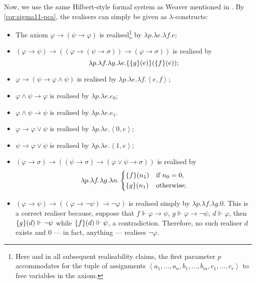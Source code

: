 \documentclass[11pt]{article}
\theoremstyle{plain}
\theoremstyle{definition}
\newcommand{\tuple}[1]{\left\langle #1 \right\rangle}
\begin{document}
Now, we use the same Hilbert-style formal system as Weaver mentioned in \cite{weaver09-cm}. By \autoref{cor:sigma11-pca}, the realisers can simply be given as $\lambda$-constructs:
\begin{itemize}
    \item The axiom $\varphi \rightarrow \left(\psi \rightarrow \varphi\right)$ is realised\footnote{Here and in all subsequent realisability claims, the first parameter $p$ accommodates for the tuple of assignments $\tuple{a_1, \ldots, a_n, b_1, \ldots, b_m, c_1, \ldots, c_r}$ to free variables in the axiom.} by $\lambda p. \lambda e. \lambda f. e$;
    \item $\left(\varphi \rightarrow \psi\right) \rightarrow \left(\left(\varphi \rightarrow \left(\psi \rightarrow \sigma\right)\right) \rightarrow \left(\varphi \rightarrow \sigma\right)\right)$ is realised by
          \[\lambda p. \lambda f. \lambda g. \lambda e. \mleft\{\mleft\{g\mright\}\mleft(e\mright)\mright\}\mleft(\mleft\{f\mright\}\mleft(e\mright)\mright);\]
    \item $\varphi \rightarrow \left(\psi \rightarrow \varphi \land \psi\right)$ is realised by $\lambda p. \lambda e. \lambda f. \tuple{e, f}$;
    \item $\varphi \land \psi \rightarrow \varphi$ is realised by $\lambda p. \lambda e. e_0$;
    \item $\varphi \land \psi \rightarrow \psi$ is realised by $\lambda p. \lambda e. e_1$.
    \item $\varphi \rightarrow \varphi \lor \psi$ is realised by $\lambda p. \lambda e. \tuple{0, e}$;
    \item $\psi \rightarrow \varphi \lor \psi$ is realised by $\lambda p. \lambda e. \tuple{1, e}$;
    \item $\left(\varphi \rightarrow \sigma\right) \rightarrow \left(\left(\psi \rightarrow \sigma\right) \rightarrow \left(\varphi \lor \psi \rightarrow \sigma\right)\right)$ is realised by
          \[\lambda p. \lambda f. \lambda g. \lambda n. \left\{\begin{aligned}
                   & \mleft\{f\mright\}\mleft(n_1\mright) &  & \text{if} \ n_0 = 0, \\
                   & \mleft\{g\mright\}\mleft(n_1\mright) &  & \text{otherwise};    \\
              \end{aligned}\right.\]
    \item $\left(\varphi \rightarrow \psi\right) \rightarrow \left(\left(\varphi \rightarrow \neg \psi\right) \rightarrow \neg \varphi\right)$ is realised simply by $\lambda p. \lambda f. \lambda g. 0$. This is a correct realiser because, suppose that $f \Vdash \varphi \rightarrow \psi$, $g \Vdash \varphi \rightarrow \neg \psi$, $d \Vdash \varphi$, then $\mleft\{g\mright\}\mleft(d\mright) \Vdash \neg \psi$ while $\mleft\{f\mright\}\mleft(d\mright) \Vdash \psi$, a contradiction. Therefore, no such realiser $d$ exists and $0$ --- in fact, anything --- realises $\neg \varphi$.

\end{itemize}
\end{document}
